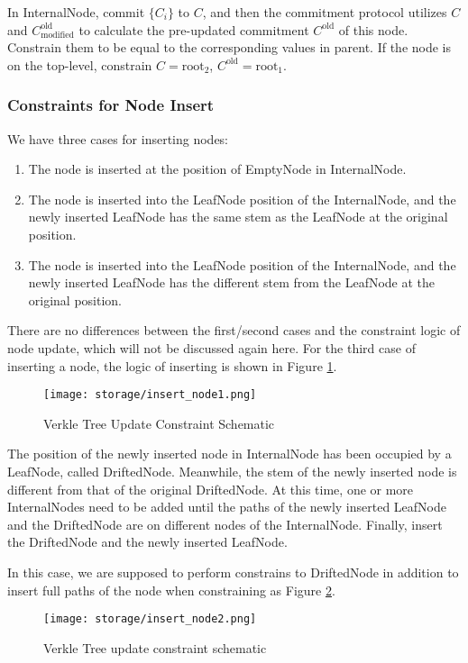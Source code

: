 In InternalNode, commit $\{C_i\}$ to $C$, and then the commitment protocol utilizes $C$ and $C^\text{old}_\text{modified}$ to calculate the pre-updated commitment $C^\text{old}$ of this node. Constrain them to be equal to the corresponding values in parent. If the node is on the top-level, constrain $C = \text{root}_2$, $C^\text{old} = \text{root}_1$.

\subsubsection{Constraints for Node Insert}

We have three cases for inserting nodes:
\begin{enumerate}
    \item The node is inserted at the position of EmptyNode in InternalNode.
    \item The node is inserted into the LeafNode position of the InternalNode, and the newly inserted LeafNode has the same stem as the LeafNode at the original position.
    \item The node is inserted into the LeafNode position of the InternalNode, and the newly inserted LeafNode has the different stem from the LeafNode at the original position.
\end{enumerate}

There are no differences between the first/second cases and the constraint logic of node update, which will not be discussed again here. For the third case of inserting a node, the logic of inserting is shown in Figure \ref{fig:insert-constraint-1}.
\begin{figure}[!ht]
    \centering
    \texttt{[image: storage/insert\_node1.png]}
    \caption{Verkle Tree Update Constraint Schematic}
    \label{fig:insert-constraint-1}
\end{figure}

The position of the newly inserted node in InternalNode has been occupied by a LeafNode, called DriftedNode. Meanwhile, the stem of the newly inserted node is different from that of the original DriftedNode. At this time, one or more InternalNodes need to be added until the paths of the newly inserted LeafNode and the DriftedNode are on different nodes of the InternalNode. Finally, insert the DriftedNode and the newly inserted LeafNode.

In this case, we are supposed to perform constrains to DriftedNode in addition to insert full paths of the node when constraining as Figure \ref{fig:insert-constraint-2}.
\begin{figure}[!ht]
    \centering
    \texttt{[image: storage/insert\_node2.png]}
    \caption{Verkle Tree update constraint schematic}
    \label{fig:insert-constraint-2}
\end{figure}
